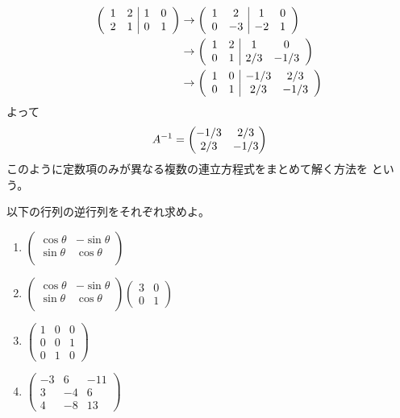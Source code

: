 \documentclass[twocolumn,11pt]{jarticle}
\begin{document}
\begin{align}
  \left(
  \begin{array}{cc|cc}
    1 & 2 & 1 & 0 \\
    2 & 1 & 0 & 1
  \end{array}\right)
&\to
  \left(
  \begin{array}{cc|cc}
    1 & 2 & 1 & 0 \\
    0 & -3 & -2 & 1
  \end{array}\right)\notag\\
&\to
  \left(
  \begin{array}{cc|cc}
    1 & 2 & 1 & 0 \\
    0 & 1 & 2/3 & -1/3
  \end{array}\right)\notag\\
&\to
  \left(
  \begin{array}{cc|cc}
    1 & 0 & -1/3 & 2/3 \\
    0 & 1 & 2/3 & -1/3
  \end{array}\right)\notag
\end{align}
よって
\begin{align}
  A^{-1}=
  \begin{pmatrix}
    -1/3 & 2/3 \\
    2/3 & -1/3
  \end{pmatrix}\notag
\end{align}
このように定数項のみが異なる複数の連立方程式をまとめて解く方法を
という。

\exercise
以下の行列の逆行列をそれぞれ求めよ。
\begin{enumerate}
\item $\begin{pmatrix}
    \cos\theta & -\sin\theta\\
    \sin\theta& \cos\theta\\
  \end{pmatrix}$
\item $\begin{pmatrix}
    \cos\theta & -\sin\theta\\
    \sin\theta& \cos\theta\\
  \end{pmatrix}
  \begin{pmatrix}
    3 & 0 \\
    0 & 1
  \end{pmatrix}$
\item $\begin{pmatrix}
    1 & 0 & 0\\
    0 & 0 & 1\\
    0 & 1 & 0
  \end{pmatrix}$
\item $\begin{pmatrix}
    -3 & 6 & -11\\
    3 & -4 & 6\\
    4 & -8 & 13
  \end{pmatrix}$
\end{enumerate}
% 
\end{document}
